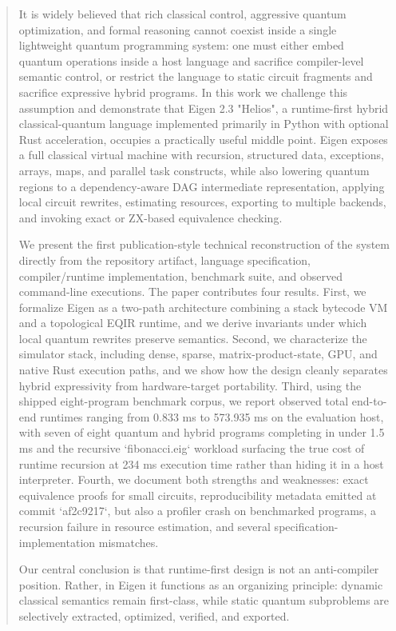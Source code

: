 \begin{quote}
\small
\justifying
It is widely believed that rich classical control, aggressive quantum optimization, and formal reasoning cannot coexist inside a single lightweight quantum programming system: one must either embed quantum operations inside a host language and sacrifice compiler-level semantic control, or restrict the language to static circuit fragments and sacrifice expressive hybrid programs. In this work we challenge this assumption and demonstrate that Eigen 2.3 "Helios", a runtime-first hybrid classical-quantum language implemented primarily in Python with optional Rust acceleration, occupies a practically useful middle point. Eigen exposes a full classical virtual machine with recursion, structured data, exceptions, arrays, maps, and parallel task constructs, while also lowering quantum regions to a dependency-aware DAG intermediate representation, applying local circuit rewrites, estimating resources, exporting to multiple backends, and invoking exact or ZX-based equivalence checking.

We present the first publication-style technical reconstruction of the system directly from the repository artifact, language specification, compiler/runtime implementation, benchmark suite, and observed command-line executions. The paper contributes four results. First, we formalize Eigen as a two-path architecture combining a stack bytecode VM and a topological EQIR runtime, and we derive invariants under which local quantum rewrites preserve semantics. Second, we characterize the simulator stack, including dense, sparse, matrix-product-state, GPU, and native Rust execution paths, and we show how the design cleanly separates hybrid expressivity from hardware-target portability. Third, using the shipped eight-program benchmark corpus, we report observed total end-to-end runtimes ranging from 0.833 ms to 573.935 ms on the evaluation host, with seven of eight quantum and hybrid programs completing in under 1.5 ms and the recursive `fibonacci.eig` workload surfacing the true cost of runtime recursion at 234 ms execution time rather than hiding it in a host interpreter. Fourth, we document both strengths and weaknesses: exact equivalence proofs for small circuits, reproducibility metadata emitted at commit `af2c9217`, but also a profiler crash on benchmarked programs, a recursion failure in resource estimation, and several specification-implementation mismatches.

Our central conclusion is that runtime-first design is not an anti-compiler position. Rather, in Eigen it functions as an organizing principle: dynamic classical semantics remain first-class, while static quantum subproblems are selectively extracted, optimized, verified, and exported.

\end{quote}
